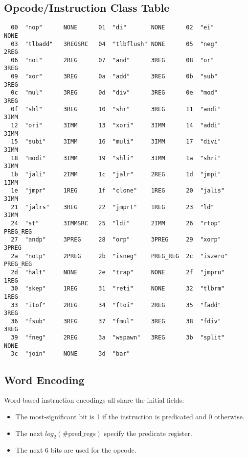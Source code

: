 \documentclass[10pt,letterpaper]{article}
\begin{document}
\subsection{Opcode/Instruction Class Table}
\begin{verbatim}
  00  "nop"      NONE      01  "di"       NONE      02  "ei"       NONE 
  03  "tlbadd"   3REGSRC   04  "tlbflush" NONE      05  "neg"      2REG     
  06  "not"      2REG      07  "and"      3REG      08  "or"       3REG     
  09  "xor"      3REG      0a  "add"      3REG      0b  "sub"      3REG     
  0c  "mul"      3REG      0d  "div"      3REG      0e  "mod"      3REG
  0f  "shl"      3REG      10  "shr"      3REG      11  "andi"     3IMM     
  12  "ori"      3IMM      13  "xori"     3IMM      14  "addi"     3IMM     
  15  "subi"     3IMM      16  "muli"     3IMM      17  "divi"     3IMM     
  18  "modi"     3IMM      19  "shli"     3IMM      1a  "shri"     3IMM     
  1b  "jali"     2IMM      1c  "jalr"     2REG      1d  "jmpi"     1IMM
  1e  "jmpr"     1REG      1f  "clone"    1REG      20  "jalis"    3IMM
  21  "jalrs"    3REG      22  "jmprt"    1REG      23  "ld"       3IMM
  24  "st"       3IMMSRC   25  "ldi"      2IMM      26  "rtop"     PREG_REG
  27  "andp"     3PREG     28  "orp"      3PREG     29  "xorp"     3PREG    
  2a  "notp"     2PREG     2b  "isneg"    PREG_REG  2c  "iszero"   PREG_REG 
  2d  "halt"     NONE      2e  "trap"     NONE      2f  "jmpru"    1REG
  30  "skep"     1REG      31  "reti"     NONE      32  "tlbrm"    1REG
  33  "itof"     2REG      34  "ftoi"     2REG      35  "fadd"     3REG
  36  "fsub"     3REG      37  "fmul"     3REG      38  "fdiv"     3REG
  39  "fneg"     2REG      3a  "wspawn"   3REG      3b  "split"    NONE
  3c  "join"     NONE      3d  "bar"
\end{verbatim}

\subsection{Word Encoding}

Word-based instruction encodings all share the initial fields:
\begin{itemize}
  \item The most-significant bit is 1 if the instruction is predicated and 0 otherwise.
  \item The next $log_2(\mathrm{\#pred\_regs})$ specify the predicate register.
  \item The next 6 bits are used for the opcode.
\end{itemize}
\end{document}
